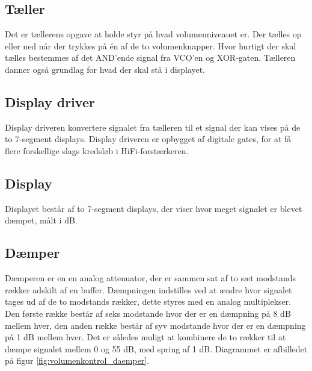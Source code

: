 \subsection*{Tæller}
\label{volumenkontrol-simulering-taeller}

Det er tællerens opgave at holde styr på hvad volumenniveauet er. Der tælles op eller ned når der trykkes på én af de to volumenknapper. Hvor hurtigt der skal tælles bestemmes af det AND'ende signal fra VCO'en og XOR-gaten. Tælleren danner også grundlag for hvad der skal stå i displayet.

\subsection*{Display driver}
\label{volumenkontrol-simulering-display_driver}

Display driveren konvertere signalet fra tælleren til et signal der kan vises på de to 7-segment displays. Display driveren er opbygget af digitale gates, for at få flere forskellige slags kredsløb i HiFi-forstærkeren.

\subsection*{Display}
\label{volumenkontrol-simulering-display}

Displayet består af to 7-segment displays, der viser hvor meget signalet er blevet dæmpet, målt i dB.

\subsection*{Dæmper}
\label{volumenkontrol-simulering-daemper}

Dæmperen er en en analog attenuator, der er sammen sat af to sæt modstands rækker adskilt af en buffer. Dæmpningen indstilles ved at ændre hvor signalet tages ud af de to modstands rækker, dette styres med en analog multiplekser. Den første række består af seks modstande hvor der er en dæmpning på 8 dB mellem hver, den anden række består af syv modstande hvor der er en dæmpning på 1 dB mellem hver. Det er således muligt at kombinere de to rækker til at dæmpe signalet mellem 0 og 55 dB, med spring af 1 dB. Diagrammet er afbilledet på figur \ref{fig:volumenkontrol_daemper}.

